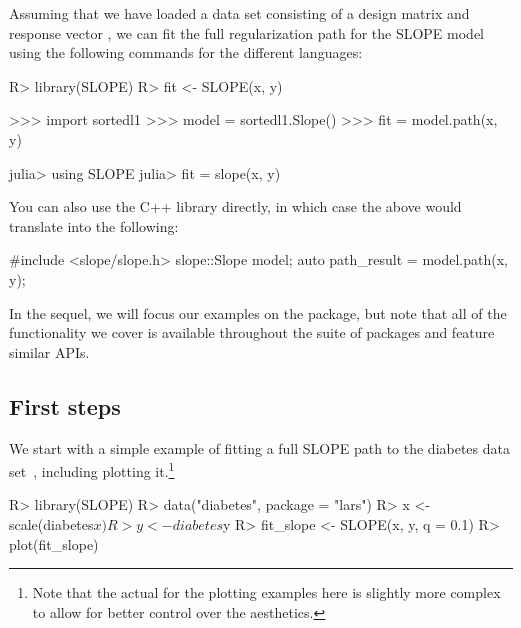 \documentclass[article]{jss}
\begin{document}
Assuming that we have loaded a data set consisting of a design
matrix  and response vector , we can fit the full regularization
path for the SLOPE model using the following commands for the different languages:

\begin{minipage}[t]{0.24\textwidth}%
  \textbf{}
  \begin{Code}
R> library(SLOPE)
R> fit <- SLOPE(x, y)
  \end{Code}
\end{minipage}
\hfill
\begin{minipage}[t]{0.33\textwidth}%
  \textbf{}
  \begin{Code}
>>> import sortedl1
>>> model = sortedl1.Slope()
>>> fit = model.path(x, y)
  \end{Code}
\end{minipage}
\hfill
\begin{minipage}[t]{0.32\textwidth}%
  \textbf{}
  \begin{Code}
julia> using SLOPE
julia> fit = slope(x, y)
  \end{Code}
\end{minipage}

\medskip

You can also use the C++ library directly, in
which case the above would translate into the
following:
\begin{Code}
#include <slope/slope.h>
slope::Slope model;
auto path_result = model.path(x, y);
\end{Code}

In the sequel, we will focus our examples on the  package, but
note that all of the functionality we cover is available throughout
the suite of packages and feature similar APIs.

\subsection{First steps}

We start with a simple example of fitting a full SLOPE path to the diabetes
data set~\citep{efron2004}, including plotting it.\footnote{Note that
  the actual for the plotting examples here is slightly more complex
  to allow for better control over the aesthetics.}

\begin{Code}
R> library(SLOPE)
R> data("diabetes", package = "lars")
R> x <- scale(diabetes$x)
R> y <- diabetes$y
R> fit_slope <- SLOPE(x, y, q = 0.1)
R> plot(fit_slope)
\end{Code}
\end{document}
